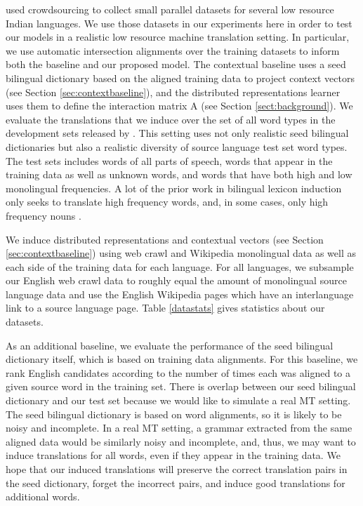 \documentclass[11pt]{article}
\begin{document}
 used crowdsourcing to collect small parallel datasets for several low resource Indian languages. 
We use those datasets in our experiments here in order to test our models in a realistic low resource machine translation setting.
In particular, we use automatic intersection alignments over the training datasets to inform both the baseline and our proposed model. %
The contextual baseline uses a seed bilingual dictionary based on the aligned training data to project context vectors (see Section \ref{sec:contextbaseline}), and the distributed representations learner uses them to define the interaction matrix A (see Section \ref{sect:background}).
We evaluate the translations that we induce over the set of all word types in the development sets released by .
This setting uses not only realistic seed bilingual dictionaries but also a realistic diversity of source language test set word types.
The test sets includes words of all parts of speech, words that appear in the training data as well as unknown words, and words that have both high and low monolingual frequencies.
A lot of the prior work in bilingual lexicon induction only seeks to translate high frequency words, and, in some cases, only high frequency nouns \cite{koehn02,haghighi08}.

We induce distributed representations and contextual vectors (see Section \ref{sec:contextbaseline}) using web crawl and Wikipedia monolingual data as well as each side of the training data for each language.
For all languages, we subsample our English web crawl data to roughly equal the amount of monolingual source language data and use the English Wikipedia pages which have an interlanguage link to a source language page.
Table \ref{datastats} gives statistics about our datasets.

As an additional baseline, we evaluate the performance of the seed bilingual dictionary itself, which is based on training data alignments.
For this baseline, we rank English candidates according to the number of times each was aligned to a given source word in the training set.
There is overlap between our seed bilingual dictionary and our test set because we would like to simulate a real MT setting.
The seed bilingual dictionary is based on word alignments, so it is likely to be noisy and incomplete. 
In a real MT setting, a grammar extracted from the same aligned data would be similarly noisy and incomplete, and, thus, we may want to induce translations for all words, even if they appear in the training data.
We hope that our induced translations will preserve the correct translation pairs in the seed dictionary, forget the incorrect pairs, and induce good translations for additional words.
\end{document}
